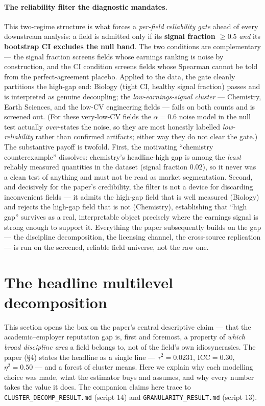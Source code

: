 \documentclass[11pt]{article}
\begin{document}
\paragraph{The reliability filter the diagnostic mandates.}
This two-regime structure is what forces a \emph{per-field reliability gate} ahead of every downstream analysis: a field is admitted only if its \textbf{signal fraction $\ge 0.5$} \emph{and} its \textbf{bootstrap CI excludes the null band}. The two conditions are complementary --- the signal fraction screens fields whose earnings ranking is noise by construction, and the CI condition screens fields whose Spearman cannot be told from the perfect-agreement placebo. Applied to the data, the gate cleanly partitions the high-gap end: Biology (tight CI, healthy signal fraction) passes and is interpreted as genuine decoupling; the \emph{low-earnings-signal cluster} --- Chemistry, Earth Sciences, and the low-CV engineering fields --- fails on both counts and is screened out. (For these very-low-CV fields the $\alpha=0.6$ noise model in the null test actually \emph{over}-states the noise, so they are most honestly labelled \emph{low-reliability} rather than confirmed artifacts; either way they do not clear the gate.) The substantive payoff is twofold. First, the motivating ``chemistry counterexample'' dissolves: chemistry's headline-high gap is among the \emph{least} reliably measured quantities in the dataset (signal fraction $0.02$), so it never was a clean test of anything and must not be read as market segmentation. Second, and decisively for the paper's credibility, the filter is not a device for discarding inconvenient fields --- it admits the high-gap field that is well measured (Biology) and rejects the high-gap field that is not (Chemistry), establishing that ``high gap'' survives as a real, interpretable object precisely where the earnings signal is strong enough to support it. Everything the paper subsequently builds on the gap --- the discipline decomposition, the licensing channel, the cross-source replication --- is run on the screened, reliable field universe, not the raw one.\section{The headline multilevel decomposition}
\label{sec:companion-decomp}

This section opens the box on the paper's central descriptive claim --- that the academic--employer reputation gap is, first and foremost, a property of \emph{which broad discipline area} a field belongs to, not of the field's own idiosyncrasies. The paper (\S4) states the headline as a single line --- $\tau^2=0.0231$, $\mathrm{ICC}=0.30$, $\eta^2=0.50$ --- and a forest of cluster means. Here we explain why each modelling choice was made, what the estimator buys and assumes, and why every number takes the value it does. The companion claims here trace to \texttt{CLUSTER\_DECOMP\_RESULT.md} (script 14) and \texttt{GRANULARITY\_RESULT.md} (script 13).
\end{document}
